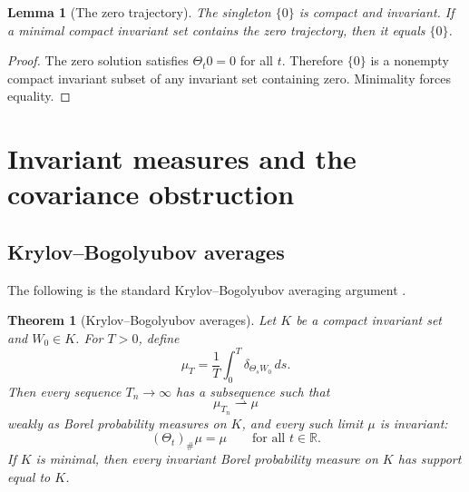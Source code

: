 \documentclass[11pt]{amsart}
\theoremstyle{plain}
\newtheorem{theorem}{Theorem}[section]
\newtheorem{lemma}[lemma]{Lemma}
\theoremstyle{definition}
\theoremstyle{remark}
\numberwithin{equation}{section}
\newcommand{\R}{\mathbb R}
\begin{document}
\begin{lemma}[The zero trajectory]\label{p2:lem:zero-trajectory}
The singleton \(\{0\}\) is compact and invariant.  If a minimal compact
invariant set contains the zero trajectory, then it equals \(\{0\}\).
\end{lemma}

\begin{proof}
The zero solution satisfies \(\Theta_t0=0\) for all \(t\).  Therefore
\(\{0\}\) is a nonempty compact invariant subset of any invariant set
containing zero.  Minimality forces equality.
\end{proof}

\section{Invariant measures and the covariance obstruction}
\label{p2:sec:measures-covariance}

\subsection{Krylov--Bogolyubov averages}

The following is the standard Krylov--Bogolyubov averaging argument
\cite{KryloffBogoliouboff1937,Billingsley1999}.

\begin{theorem}[Krylov--Bogolyubov averages]\label{p2:thm:KB}
Let \(K\) be a compact invariant set and \(W_0\in K\).  For \(T>0\), define
\[
   \mu_T
   =
   \frac1T\int_0^T\delta_{\Theta_sW_0}\,ds .
\]
Then every sequence \(T_n\to\infty\) has a subsequence such that
\[
   \mu_{T_n}\rightharpoonup\mu
\]
weakly as Borel probability measures on \(K\), and every such limit \(\mu\)
is invariant:
\[
   (\Theta_t)_\#\mu=\mu
   \qquad\text{for all }t\in\R .
\]
If \(K\) is minimal, then every invariant Borel probability measure on \(K\)
has support equal to \(K\).
\end{theorem}
\end{document}
